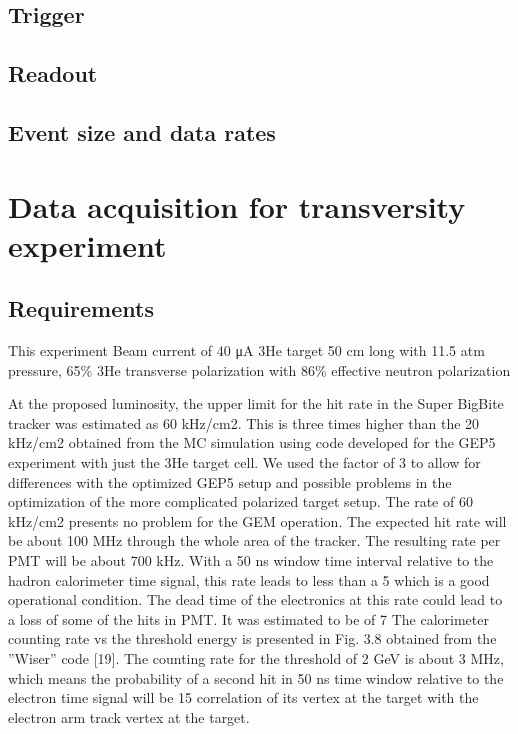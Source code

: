 \documentclass{article}
\begin{document}
\subsection{Trigger}

\subsection{Readout}

\subsection{Event size and data rates}

\section{Data acquisition for transversity experiment}
\subsection{Requirements}
This experiment
Beam current of 40 μA
3He target 50 cm long with 11.5 atm pressure, 65\% 3He transverse polarization with
86\% effective neutron polarization

At the proposed luminosity, the upper limit for the hit rate in the Super BigBite tracker
was estimated as 60 kHz/cm2. This is three times higher than the 20 kHz/cm2 obtained
from the MC simulation using code developed for the GEP5 experiment with just the 3He
target cell. We used the factor of 3 to allow for differences with the optimized GEP5 setup
and possible problems in the optimization of the more complicated polarized target setup.
The rate of 60 kHz/cm2 presents no problem for the GEM operation. The expected hit rate
will be about 100 MHz through the whole area of the tracker.
The resulting
rate per PMT will be about 700 kHz. With a 50 ns window time interval relative to the
hadron calorimeter time signal, this rate leads to less than a 5%
which is a good operational condition. The dead time of the electronics at this rate could
lead to a loss of some of the hits in PMT. It was estimated to be of 7%
The calorimeter counting rate vs the threshold energy is presented in Fig. 3.8 obtained
from the ”Wiser” code [19]. The counting rate for the threshold of 2 GeV is about 3 MHz,
which means the probability of a second hit in 50 ns time window relative to the electron
time signal will be 15%
correlation of its vertex at the target with the electron arm track vertex at the target.
\end{document}
